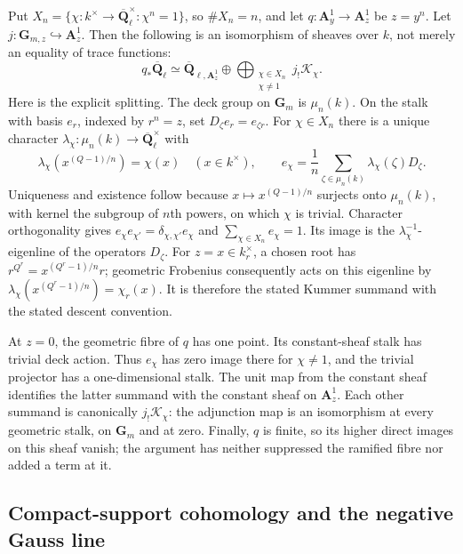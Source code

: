 Put \(X_n=\{\chi:k^\times\to\overline{\mathbf Q}_\ell^\times:
\chi^n=1\}\), so \(\#X_n=n\), and let
\(q:\mathbf A^1_y\to\mathbf A^1_z\) be \(z=y^n\).
Let \(j:\mathbf G_{m,z}\hookrightarrow\mathbf A^1_z\).
Then the following is an isomorphism of sheaves over \(k\), not
merely an equality of trace functions:
\[
 q_*\overline{\mathbf Q}_\ell
   \simeq \overline{\mathbf Q}_{\ell,\mathbf A^1_z}
     \oplus
     \bigoplus_{\substack{\chi\in X_n\\\chi\ne1}}
          j_!\mathcal K_\chi.
 \tag{SPF.9}\label{eq:SPF9}
\]
Here is the explicit splitting. The deck group on \(\mathbf G_m\)
is \(\mu_n(k)\). On the stalk with basis \(e_r\), indexed by
\(r^n=z\), set \(D_\zeta e_r=e_{\zeta r}\). For \(\chi\in X_n\)
there is a unique character \(\lambda_\chi:\mu_n(k)\to
\overline{\mathbf Q}_\ell^\times\) with
\[
 \lambda_\chi(x^{(Q-1)/n})=\chi(x)\quad(x\in k^\times),\qquad
 e_\chi=\frac1n\sum_{\zeta\in\mu_n(k)}
                   \lambda_\chi(\zeta)D_\zeta.
 \tag{SPF.10}\label{eq:SPF10}
\]
Uniqueness and existence follow because
\(x\mapsto x^{(Q-1)/n}\) surjects onto \(\mu_n(k)\), with kernel
the subgroup of \(n\)th powers, on which \(\chi\) is trivial.
Character orthogonality gives
\(e_\chi e_{\chi'}=\delta_{\chi,\chi'}e_\chi\) and
\(\sum_{\chi\in X_n}e_\chi=1\). Its image is the
\(\lambda_\chi^{-1}\)-eigenline of the operators \(D_\zeta\).
For \(z=x\in k_r^\times\), a chosen root has
\(r^{Q^r}=x^{(Q^r-1)/n}r\); geometric Frobenius consequently acts
on this eigenline by
\(\lambda_\chi(x^{(Q^r-1)/n})=\chi_r(x)\).
It is therefore the stated Kummer summand with the stated descent
convention.

At \(z=0\), the geometric fibre of \(q\) has one point. Its
constant-sheaf stalk has trivial deck action. Thus \(e_\chi\)
has zero image there for \(\chi\ne1\), and the trivial projector
has a one-dimensional stalk. The unit map from the constant sheaf
identifies the latter summand with the constant sheaf on
\(\mathbf A^1_z\). Each other summand is canonically \(j_!\mathcal
K_\chi\): the adjunction map is an isomorphism at every geometric
stalk, on \(\mathbf G_m\) and at zero. Finally, \(q\) is finite,
so its higher direct images on this sheaf vanish; the argument
has neither suppressed the ramified fibre nor added a term at it.

\subsection{Compact-support cohomology and the negative Gauss line}

